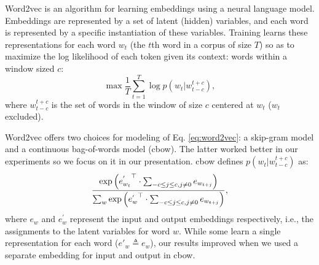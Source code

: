 \documentclass[11pt]{article}
\begin{document}
Word2vec \cite{mikolov2013distributed} is an algorithm for learning embeddings using a neural language model.
Embeddings are represented by a set of latent (hidden) variables, and each word is represented by a specific instantiation of these 
variables. Training learns these representations for each word $w_t$ (the $t$th word in a corpus of size $T$)
so as to maximize the log likelihood of each token given its context: words within a window sized $c$:
\begin{equation}
\max \frac{1}{T} \sum_{t=1}^{T} \log p\left( w_t | w_{t-c}^{t+c} \right),
\label{eq:word2vec}
\end{equation}
where $w_{t-c}^{t+c}$ is the set of words in the window of size $c$ centered at $w_t$ ($w_t$ excluded).

Word2vec offers two choices for modeling of Eq. \eqref{eq:word2vec}: a skip-gram model and
a continuous bag-of-words model (cbow). The latter worked better in our experiments so we focus on it in our presentation.
cbow defines $p(w_t|w_{t-c}^{t+c})$ as:
\vspace{-.1cm}
\begin{equation}
\vspace{-.1cm}
\frac{\exp\left( {e^{'}_{w_t}}^\top \cdot \sum_{-c \le j \le c, j \ne 0}  e_{w_{t+j}} \right)}{\sum_w \exp\left( {e^{'}_{w}}^\top \cdot \sum_{-c \le j \le c, j \ne 0}  e_{w_{t+j}} \right)},
\label{eq:cbow}
\end{equation}
where $e_w$ and $e^{'}_w$ represent the input and output embeddings respectively, i.e., the assignments to the latent variables
for word $w$. While some learn a single representation for each word ($e'_w \triangleq e_w$), our results improved when
we used a separate embedding for input and output in cbow.




\iffalse
For the skip-gram model, $p(w_t|w_{t-c:t+c})$ is
\begin{equation}
\prod_{-c \le j \le c, j \ne 0} {\frac{\exp\left( {e^{'}_{w_t}}^\top \cdot e_{w_{t+j}} \right)}{\sum_w \exp\left( {e^{'}_{w}}^\top \cdot e_{w_{t+j}} \right)} },
\label{eq:skip-gram}
\end{equation}
\fi
\end{document}
